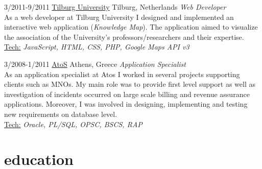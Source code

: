 \documentclass[]{friggeri-cv} %
\begin{document}
\begin{entrylist}
\entry
{3/2011-9/2011}
{\href{https://www.tilburguniversity.edu}{Tilburg University}}
{Tilburg, Netherlands}
{\emph {Web Developer} \\
As a web developer at Tilburg University I designed and implemented an interactive web application (\emph{Knowledge Map}). The application aimed to visualize the association of the University's professors/researchers and their expertise.\\
\ul{Tech:} \emph{JavaScript, HTML, CSS, PHP, Google Maps API v3}
}


\entry
{3/2008-1/2011}
{\href{http://atos.net/en-us/home.html}{AtoS}}
{Athens, Greece}
{\emph {Application Specialist}\\
As an application specialist at Atos I worked in several projects supporting clients such as MNOs. My main role was to provide first level support as well as investigation of incidents occurred on large scale billing and revenue assurance applications. Moreover, I was involved in designing, implementing and testing new requirements on database level.\\
\ul{Tech:} \emph{Oracle, PL/SQL, OPSC, BSCS, RAP} \\
}

\end{entrylist}



\section{education}
\end{document}
